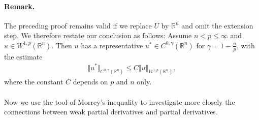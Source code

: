 \documentclass{article}
\numberwithin{equation}{section}
\newcommand{\bbR}{\mathbb{R}}
\theoremstyle{plain}
\theoremstyle{definition}
\begin{document}
\paragraph{Remark.} The preceding proof remains valid if we replace $U$ by $\bbR^n$ and omit the extension step. We therefore restate our conclusion as follows: Assume $n<p\leq\infty$ and $u\in W^{1,p}(\bbR^n)$. Then $u$ has a representative $u^*\in C^{0,\gamma}(\bbR^n)$ for $\gamma=1-\frac{n}{p}$, with the estimate
\begin{align*}
	\Vert u^*\Vert_{C^{0,\gamma}(\bbR^n)}\leq C\Vert u\Vert_{W^{1,p}(\bbR^n)},
\end{align*}
where the constant $C$ depends on $p$ and $n$ only.

\paragraph{} Now we use the tool of Morrey's inequality to investigate more closely the connections between weak partial derivatives and partial derivatives.
\end{document}
